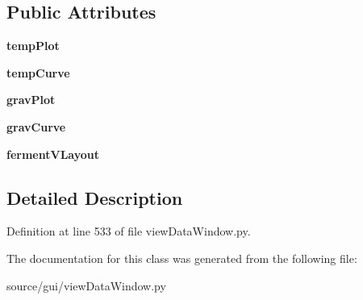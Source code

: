 \subsection*{Public Attributes}
\begin{DoxyCompactItemize}
\item 
\mbox{\label{classview_data_window_1_1_ferment_tab_aa94aeee3801dcd3a7ab9200a48336e16}} 
{\bfseries temp\+Plot}
\item 
\mbox{\label{classview_data_window_1_1_ferment_tab_a5404adf0e6f7df9f6236690b26bb3f24}} 
{\bfseries temp\+Curve}
\item 
\mbox{\label{classview_data_window_1_1_ferment_tab_a4ebbca8fc9e532c84125be445c06b7bc}} 
{\bfseries grav\+Plot}
\item 
\mbox{\label{classview_data_window_1_1_ferment_tab_a2b54120efde5d6324baf90fac9ed0600}} 
{\bfseries grav\+Curve}
\item 
\mbox{\label{classview_data_window_1_1_ferment_tab_af491587b052482ca805ef10d3af75822}} 
{\bfseries ferment\+V\+Layout}
\end{DoxyCompactItemize}


\subsection{Detailed Description}


Definition at line 533 of file view\+Data\+Window.\+py.



The documentation for this class was generated from the following file\+:\begin{DoxyCompactItemize}
\item 
source/gui/view\+Data\+Window.\+py\end{DoxyCompactItemize}
